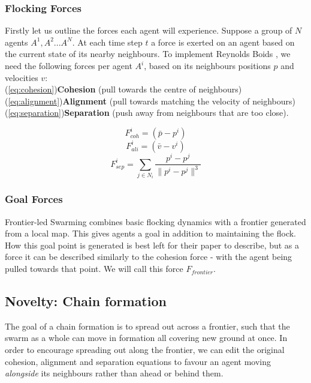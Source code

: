 \documentclass[runningheads]{llncs}
\begin{document}
\subsubsection{Flocking Forces}
Firstly let us outline the forces each agent will experience. Suppose a group of $N$ agents $A^1, A^2...A^N$. At each time step $t$ a force is exerted on an agent based on the current state of its nearby neighbours. To implement Reynolds Boids \cite{reynolds1987}, we need the following forces per agent $A^i$, based on its neighbours positions $p$ and velocities $v$:\\
\indent(\ref{eq:cohesion})\nobreakspace\textbf{Cohesion} 
    (pull towards the centre of neighbours) \\
\indent(\ref{eq:alignment})\nobreakspace\textbf{Alignment} 
    (pull towards matching the velocity of neighbours)\\
\indent(\ref{eq:separation})\nobreakspace\textbf{Separation} 
    (push away from neighbours that are too close).

\begin{multicols}{2}
    \begin{equation}
        F^i_{coh} = (\bar{p} - p^i) \label{eq:cohesion}
    \end{equation}
    \begin{equation}
        F^i_{ali} = (\bar{v} - v^i) \label{eq:alignment}
    \end{equation}
    \break
    \begin{equation}
        F^i_{sep} = \sum_{j \in N_i} \frac{p^i - p^j}{\|p^i - p^j\|^3}
        \label{eq:separation}
    \end{equation}
\end{multicols}

\subsubsection{Goal Forces}
Frontier-led Swarming\cite{tran2022} combines basic flocking dynamics with a frontier generated from a local map. This gives agents a goal in addition to maintaining the flock. How this goal point is generated is best left for their paper to describe, but as a force it can be described similarly to the cohesion force - with the agent being pulled towards that point. We will call this force $F_{frontier}$.

\subsection{Novelty: Chain formation}
The goal of a chain formation is to spread out across a frontier, such that the swarm as a whole can move in formation all covering new ground at once. In order to encourage spreading out along the frontier, we can edit the original cohesion, alignment and separation equations to favour an agent moving \textit{alongside} its neighbours rather than ahead or behind them.
\end{document}
